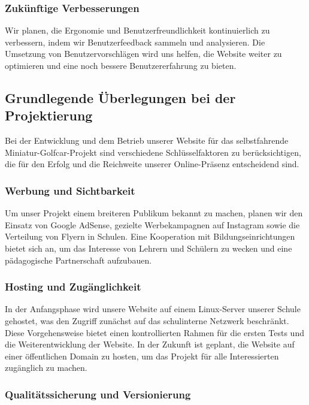\subsubsection{Zukünftige Verbesserungen}
Wir planen, die Ergonomie und Benutzerfreundlichkeit kontinuierlich zu verbessern, indem wir Benutzerfeedback sammeln und analysieren. Die Umsetzung von Benutzervorschlägen wird uns helfen, die Website weiter zu optimieren und eine noch bessere Benutzererfahrung zu bieten.

\subsection{Grundlegende Überlegungen bei der Projektierung}

Bei der Entwicklung und dem Betrieb unserer Website für das selbstfahrende Miniatur-Golfcar-Projekt sind verschiedene Schlüsselfaktoren zu berücksichtigen, die für den Erfolg und die Reichweite unserer Online-Präsenz entscheidend sind.

\subsubsection{Werbung und Sichtbarkeit}

Um unser Projekt einem breiteren Publikum bekannt zu machen, planen wir den Einsatz von Google AdSense, gezielte Werbekampagnen auf Instagram sowie die Verteilung von Flyern in Schulen. Eine Kooperation mit Bildungseinrichtungen bietet sich an, um das Interesse von Lehrern und Schülern zu wecken und eine pädagogische Partnerschaft aufzubauen.

\subsubsection{Hosting und Zugänglichkeit}

In der Anfangsphase wird unsere Website auf einem Linux-Server unserer Schule gehostet, was den Zugriff zunächst auf das schulinterne Netzwerk beschränkt. Diese Vorgehensweise bietet einen kontrollierten Rahmen für die ersten Tests und die Weiterentwicklung der Website. In der Zukunft ist geplant, die Website auf einer öffentlichen Domain zu hosten, um das Projekt für alle Interessierten zugänglich zu machen.

\subsubsection{Qualitätssicherung und Versionierung}

